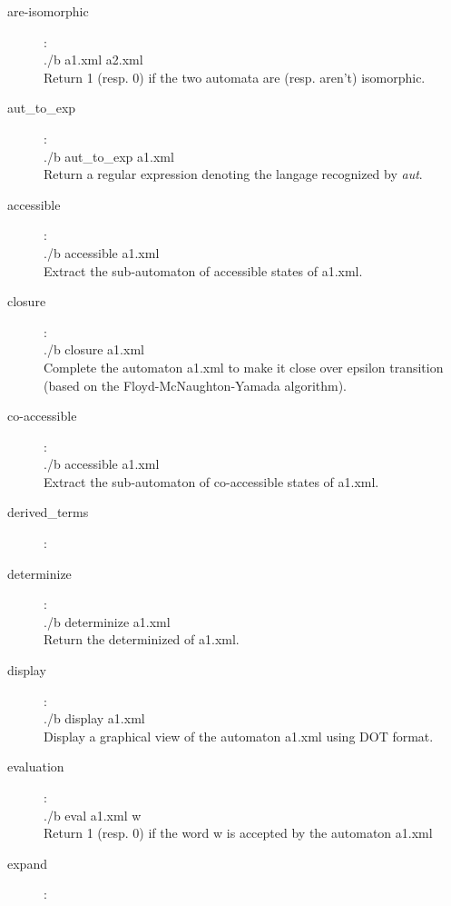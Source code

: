 \begin{description}
  \item [are-isomorphic] :\\
    ./b a1.xml a2.xml\\
    Return 1 (resp. 0) if the two automata are (resp. aren't)
    isomorphic.

  \item [aut\_to\_exp] : \\
    ./b aut\_to\_exp a1.xml\\
    Return a regular expression denoting the langage recognized by
    \textit{aut}.

  \item [accessible] :\\
    ./b accessible a1.xml\\
    Extract the sub-automaton of accessible states of a1.xml.

  \item [closure] :\\
    ./b closure a1.xml\\
    Complete the automaton a1.xml to make it
    close over epsilon transition (based on the
    Floyd-McNaughton-Yamada algorithm).

  \item [co-accessible] :\\
    ./b accessible a1.xml\\
    Extract the sub-automaton of co-accessible states of a1.xml.

  \item [derived\_terms] :\\

  \item [determinize] :\\
    ./b determinize a1.xml\\
    Return the determinized of a1.xml.

  \item [display] :\\
    ./b display a1.xml\\
    Display a graphical view of the automaton a1.xml using DOT format.

  \item [evaluation] :\\
    ./b eval a1.xml w\\
    Return 1 (resp. 0) if the word w is accepted by the automaton
    a1.xml

  \item [expand] :\\


\end{description}
